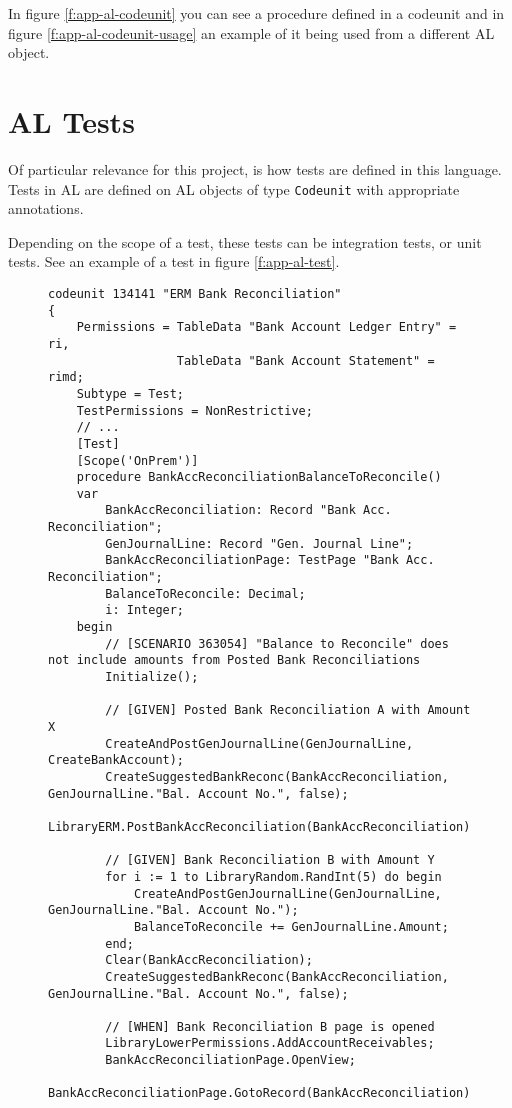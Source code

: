 In figure \ref{f:app-al-codeunit} you can see a procedure defined in a codeunit and in figure \ref{f:app-al-codeunit-usage}
an example of it being used from a different AL object.

\section{AL Tests}

Of particular relevance for this project, is how tests are defined in this language. Tests in AL are defined
 on AL objects of type \texttt{Codeunit} with appropriate annotations.

Depending on the scope of a test, these tests can be integration tests, or unit tests. See
an example of a test in figure \ref{f:app-al-test}.

\begin{figure}
    \begin{Verbatim}[fontsize=\small]
codeunit 134141 "ERM Bank Reconciliation"
{
    Permissions = TableData "Bank Account Ledger Entry" = ri,
                  TableData "Bank Account Statement" = rimd;
    Subtype = Test;
    TestPermissions = NonRestrictive;
    // ...
    [Test]
    [Scope('OnPrem')]
    procedure BankAccReconciliationBalanceToReconcile()
    var
        BankAccReconciliation: Record "Bank Acc. Reconciliation";
        GenJournalLine: Record "Gen. Journal Line";
        BankAccReconciliationPage: TestPage "Bank Acc. Reconciliation";
        BalanceToReconcile: Decimal;
        i: Integer;
    begin
        // [SCENARIO 363054] "Balance to Reconcile" does not include amounts from Posted Bank Reconciliations
        Initialize();

        // [GIVEN] Posted Bank Reconciliation A with Amount X
        CreateAndPostGenJournalLine(GenJournalLine, CreateBankAccount);
        CreateSuggestedBankReconc(BankAccReconciliation, GenJournalLine."Bal. Account No.", false);
        LibraryERM.PostBankAccReconciliation(BankAccReconciliation);

        // [GIVEN] Bank Reconciliation B with Amount Y
        for i := 1 to LibraryRandom.RandInt(5) do begin
            CreateAndPostGenJournalLine(GenJournalLine, GenJournalLine."Bal. Account No.");
            BalanceToReconcile += GenJournalLine.Amount;
        end;
        Clear(BankAccReconciliation);
        CreateSuggestedBankReconc(BankAccReconciliation, GenJournalLine."Bal. Account No.", false);

        // [WHEN] Bank Reconciliation B page is opened
        LibraryLowerPermissions.AddAccountReceivables;
        BankAccReconciliationPage.OpenView;
        BankAccReconciliationPage.GotoRecord(BankAccReconciliation);


\end{Verbatim}
\end{figure}
